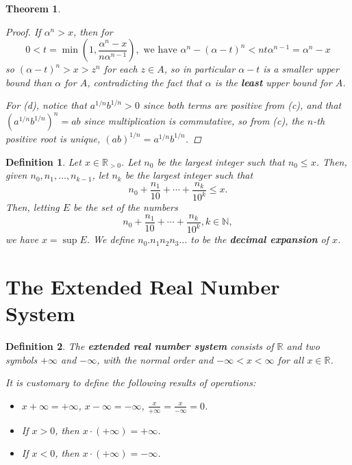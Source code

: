 \documentclass{scrbook}
\newcommand{\N}{\mathbb{N}}
\newcommand{\R}{\mathbb{R}}
\newtheorem{theorem}{Theorem}
\newtheorem{definition}{Definition}
\begin{document}
\begin{theorem}
\begin{proof}
If $\alpha^n > x$, then for
\[
	0 < t = \min\left(1, \frac{\alpha^n - x}{n\alpha^{n - 1}}\right), \text{ we have } \alpha^n - (\alpha - t)^n < nt\alpha^{n-1} = \alpha^n - x
\]
so $(\alpha - t)^n > x > z^n$ for each $z \in A$, so in particular $\alpha - t$ is a smaller upper bound than $\alpha$ for $A$, contradicting the fact that $\alpha$ is the \textbf{least} upper bound for $A$. 

For (d), notice that $a^{1/n}b^{1/n} > 0$ since both terms are positive from (c), and that $(a^{1/n}b^{1/n})^n = ab$ since multiplication is commutative, so from (c), the $n$-th positive root is unique, $(ab)^{1/n} = a^{1/n}b^{1/n}$. 
\end{proof}
\end{theorem}

\begin{definition}
Let $x \in \R_{>0}$. Let $n_0$ be the largest integer such that $n_0 \le x$. Then, given $n_0, n_1, \dotsc, n_{k-1}$, let $n_k$ be the largest integer such that 
\[
	n_0 + \frac{n_1}{10} + \dotsb + \frac{n_k}{10^k} \le x.
\]
Then, letting $E$ be the set of the numbers
\[
	n_0 + \frac{n_1}{10} + \dotsb + \frac{n_k}{10^k}, k \in \N,
\]
we have $x = \sup E$. We define $n_0.n_1n_2n_3\dots$ to be the \textbf{decimal expansion} of $x$.
\end{definition}

\section{The Extended Real Number System}
\begin{definition}
The \textbf{extended real number system} consists of $\R$ and two symbols $+\infty$ and $-\infty$, with the normal order and $-\infty < x < \infty$ for all $x \in \R$. 

It is customary to define the following results of operations:
\begin{itemize}
\item $x + \infty = +\infty$, $x - \infty = -\infty$, $\frac{x}{+\infty} = \frac{x}{-\infty} = 0$.
\item If $x > 0$, then $x \cdot (+\infty) = +\infty$.
\item If $x < 0$, then $x \cdot (+\infty) = -\infty$. 
\end{itemize}
\end{definition}
\end{document}
